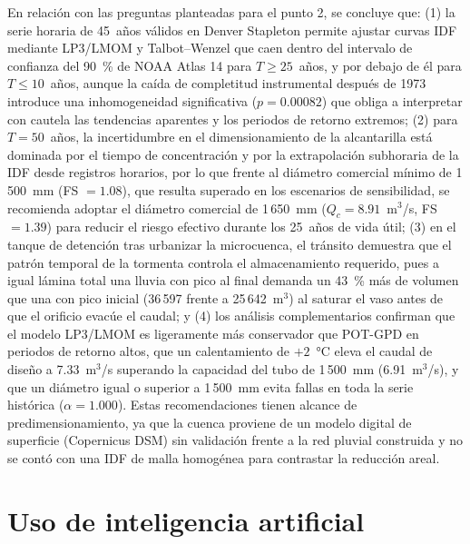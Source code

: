 \documentclass[11pt,letterpaper]{article}
\begin{document}
En relación con las preguntas planteadas para el punto 2, se concluye que: (1) la serie horaria de 45~años válidos en
Denver Stapleton permite ajustar curvas IDF mediante LP3/LMOM y Talbot--Wenzel que caen dentro del
intervalo de confianza del 90~\% de NOAA Atlas 14 para $T \geq 25$~años, y por debajo de él para $T \leq 10$~años,
aunque la caída de completitud instrumental después de 1973 introduce una inhomogeneidad significativa
($p = 0.00082$) que obliga a interpretar con cautela las tendencias aparentes y los periodos de retorno extremos; (2)
para $T = 50$~años, la incertidumbre en el dimensionamiento de la alcantarilla está dominada por el tiempo de
concentración y por la extrapolación subhoraria de la IDF desde registros horarios, por lo que frente al diámetro
comercial mínimo de 1\,500~mm (FS $= 1.08$), que resulta superado en los escenarios de sensibilidad, se recomienda
adoptar el diámetro comercial de 1\,650~mm ($Q_c = 8.91$~m$^3$/s, FS $= 1.39$) para reducir el riesgo efectivo
durante los 25~años de vida útil; (3) en el tanque de detención tras urbanizar la microcuenca, el tránsito demuestra
que el patrón temporal de la tormenta controla el almacenamiento requerido, pues a igual lámina total una lluvia con
pico al final demanda un 43~\% más de volumen que una con pico inicial (36\,597 frente a 25\,642~m$^3$) al saturar el
vaso antes de que el orificio evacúe el caudal; y (4) los análisis complementarios confirman que el modelo LP3/LMOM es
ligeramente más conservador que POT-GPD en periodos de retorno altos, que un calentamiento de $+2$~°C eleva el caudal
de diseño a 7.33~m$^3$/s superando la capacidad del tubo de 1\,500~mm (6.91~m$^3$/s), y que un diámetro igual o
superior a 1\,500~mm evita fallas en toda la serie histórica ($\alpha = 1.000$). Estas recomendaciones tienen alcance
de predimensionamiento, ya que la cuenca proviene de un modelo digital de superficie (Copernicus DSM) sin validación
frente a la red pluvial construida y no se contó con una IDF de malla homogénea para contrastar la reducción areal.


\section{Uso de inteligencia artificial}

\end{document}
